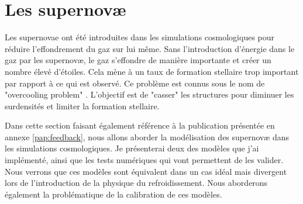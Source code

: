 \clearpage
\section{Les supernovæ}



Les supernovae ont été introduites dans les simulations cosmologiques pour réduire l'effondrement du gaz sur lui même.
Sans l'introduction d'énergie dans le gaz par les supernovæ, le gaz s'effondre de manière importante et créer un nombre élevé d'étoiles.
Cela mène à un taux de formation stellaire trop important par rapport à ce qui est observé.
Ce problème est connus sous le nom de "overcooling problem" \citep{2003ApJ...599...38B, 1992A&A...264..365B}.
L'objectif est de "casser" les structures pour diminuer les surdensités et limiter la formation stellaire.

Dans cette section faisant également référence à la publication présentée en annexe \ref{pap:feedback}, nous allons aborder la modélisation des supernovæ dans les simulations cosmologiques.
Je présenterai deux des modèles que j'ai implémenté, ainsi que les tests numériques qui vont permettent de les valider.
Nous verrons que ces modèles sont équivalent dans un cas idéal mais divergent lors de l'introduction de la physique du refroidissement.
Nous aborderons également la problématique de la calibration de ces modèles.


%
%


